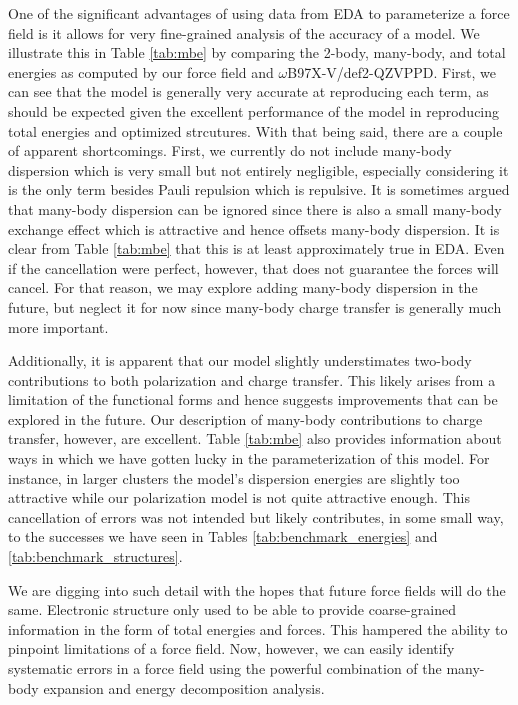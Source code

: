 \documentclass[journal=jacsat,manuscript=article]{achemso}
\begin{document}
One of the significant advantages of using data from EDA to parameterize a
force field is it allows for very fine-grained analysis of the accuracy of a model.
We illustrate this in Table \ref{tab:mbe} by comparing the 2-body, many-body, and total
energies as computed by our force field and $\omega$B97X-V/def2-QZVPPD. First, we can see
that the model is generally very accurate at reproducing each term, as should be expected
given the excellent performance of the model in reproducing total energies and optimized
strcutures. With that being said, there are a couple of apparent shortcomings. First,
we currently do not include many-body dispersion which is very small but not entirely
negligible, especially considering it is the only term besides Pauli repulsion which is
repulsive. It is sometimes argued that many-body dispersion can be ignored since there is
also a small many-body exchange effect which is attractive and hence offsets many-body
dispersion. It is clear from Table \ref{tab:mbe} that this is at least
approximately true in EDA. Even if the cancellation were perfect, however, that does
not guarantee the forces will cancel. For that reason, we may explore adding many-body
dispersion in the future, but neglect it for now since many-body charge transfer
is generally much more important.

Additionally, it is apparent that our model slightly understimates two-body contributions
to both polarization and charge transfer. This likely arises from a limitation of the
functional forms and hence suggests improvements that can be explored in the future.
Our description of many-body contributions to charge transfer, however, are excellent.
Table \ref{tab:mbe} also provides information about ways in which we have gotten lucky
in the parameterization of this model. For instance, in larger clusters the model's dispersion
energies are slightly too attractive while our polarization model is not quite attractive
enough. This cancellation of errors was not intended but likely contributes, in some small
way, to the successes we have seen in Tables \ref{tab:benchmark_energies} and \ref{tab:benchmark_structures}.

We are digging into such detail with the hopes that future force fields will do the same.
Electronic structure only used to be able to provide coarse-grained information in the form
of total energies and forces. This hampered the ability to pinpoint limitations of a force field.
Now, however, we can easily identify systematic errors in a force field using the powerful
combination of the many-body expansion and energy decomposition analysis.
\end{document}
